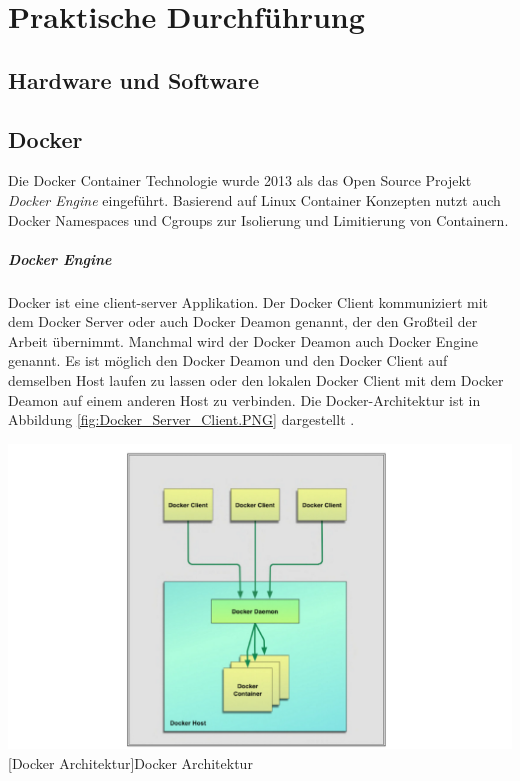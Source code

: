 \thispagestyle{empty}
\section{Praktische Durchführung}
\subsection{Hardware und Software}


\pagebreak
\subsection{Docker}
Die Docker Container Technologie wurde 2013 als das Open Source Projekt \emph{Docker Engine} eingeführt. Basierend auf Linux Container Konzepten nutzt auch Docker Namespaces und Cgroups zur Isolierung und Limitierung von Containern.  

\subparagraph{Docker Engine}
Docker ist eine client-server Applikation. Der Docker Client kommuniziert mit dem Docker Server oder auch Docker Deamon genannt, der den Großteil der Arbeit übernimmt. Manchmal wird der Docker Deamon auch Docker Engine genannt. Es ist möglich den Docker Deamon und den Docker Client auf demselben Host laufen zu lassen oder den lokalen Docker Client mit dem Docker Deamon auf einem anderen Host zu verbinden. Die Docker-Architektur ist in Abbildung \ref{fig:Docker_Server_Client.PNG} dargestellt \cite{Turnbull2015TheBook}.

\vspace{1em}
\begin{minipage}{\linewidth}
	\centering
	\includegraphics[width=1\linewidth]{pics/Docker_Server_Client.PNG}
	[Docker Architektur\cite{Turnbull2015TheBook}]{Docker Architektur}
	\label{fig:Docker_Server_Client.PNG}
\end{minipage}


